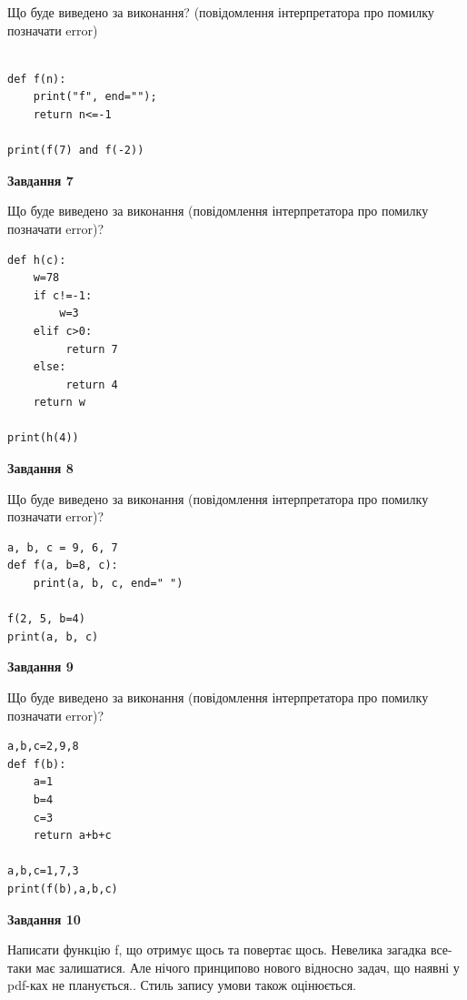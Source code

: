 \documentclass[12pt, ukrainian]{article}
\begin{document}
{\begin {large}
Що буде виведено за виконання? (повідомлення інтерпретатора про помилку позначати error)\par
\begin{verbatim}

def f(n):
    print("f", end="");
    return n<=-1

print(f(7) and f(-2))
\end{verbatim}

{\begin {center}\textbf{Завдання 7}\end {center}}

Що буде виведено за виконання (повідомлення інтерпретатора про помилку позначати error)?\par
\begin{verbatim}
def h(c):
    w=78
    if c!=-1: 
        w=3
    elif c>0:
         return 7
    else:
         return 4
    return w

print(h(4))
\end{verbatim}

{\begin {center}\textbf{Завдання 8}\end {center}}

Що буде виведено за виконання (повідомлення інтерпретатора про помилку позначати error)?\par
\begin{verbatim}
a, b, c = 9, 6, 7
def f(a, b=8, c):
    print(a, b, c, end=" ")

f(2, 5, b=4)
print(a, b, c)
\end{verbatim}

{\begin {center}\textbf{Завдання 9}\end {center}}

Що буде виведено за виконання (повідомлення інтерпретатора про помилку позначати error)?\par
\begin{verbatim}
a,b,c=2,9,8
def f(b):
    a=1
    b=4
    c=3
    return a+b+c

a,b,c=1,7,3
print(f(b),a,b,c)
\end{verbatim}

{\begin {center}\textbf{Завдання 10}\end {center}}


Написати функцiю f, що отримує щось та повертає щось. Невелика загадка все-таки має залишатися. Але нічого принципово нового відносно задач, що наявні у pdf-ках не планується.. Стиль запису умови також оцінюється.\par
\end {large}}
\newpage
\end{document}
